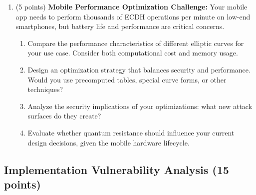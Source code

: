 \documentclass[10pt,a4paper,american]{article}
\begin{document}
\begin{enumerate}
	\item (5 points) \textbf{Mobile Performance Optimization Challenge:}
	      Your mobile app needs to perform thousands of ECDH operations per minute on low-end smartphones, but battery life and performance are critical concerns.
	      \begin{enumerate}
		      \item Compare the performance characteristics of different elliptic curves for your use case. Consider both computational cost and memory usage.
		      \item Design an optimization strategy that balances security and performance. Would you use precomputed tables, special curve forms, or other techniques?
		      \item Analyze the security implications of your optimizations: what new attack surfaces do they create?
		      \item Evaluate whether quantum resistance should influence your current design decisions, given the mobile hardware lifecycle.
	      \end{enumerate}
\end{enumerate}

\subsection{Implementation Vulnerability Analysis (15 points)}
\end{document}
